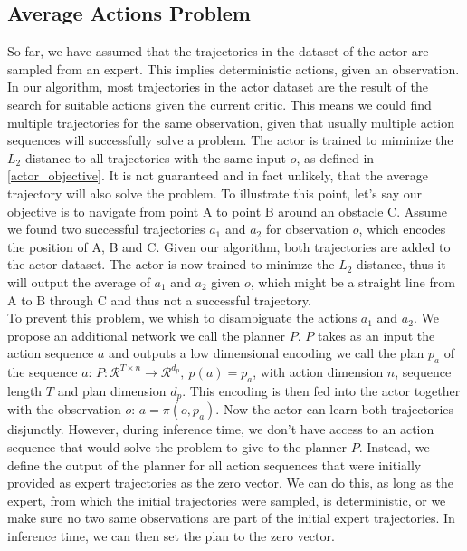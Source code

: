 \subsection{Average Actions Problem}
\label{avr_action_problem}
So far, we have assumed that the trajectories in the dataset of the actor are sampled from an expert. This implies deterministic actions, given an observation. 
In our algorithm, most trajectories in the actor dataset are the result of the search for suitable actions given the current critic. This means we could find
multiple trajectories for the same observation, given that usually multiple action sequences will successfully solve a problem. The actor is trained to miminize 
the $L_2$ distance to all trajectories with the same input $o$, as defined in \ref{actor_objective}. It is not guaranteed and in fact unlikely, that the 
average trajectory will also solve the problem. To illustrate this point, let's say our objective 
is to navigate from point A to point B around an obstacle C. Assume we found two successful trajectories 
$a_1$ and $a_2$ for observation $o$, which encodes the position of A, B and C. Given our algorithm, both trajectories are added to the actor dataset. 
The actor is now trained to minimze the $L_2$ distance, thus it will output the average of $a_1$ and $a_2$ given $o$, which might be a straight line from A to B 
through C and thus not a successful trajectory. \\
To prevent this problem, we whish to disambiguate the actions $a_1$ and $a_2$. We propose an additional network we call the planner $P$. $P$ takes as an input 
the action sequence $a$ and outputs a low dimensional encoding we call the plan $p_a$ of the sequence $a$: 
$P:\mathcal{R}^{T\times n} \rightarrow \mathcal{R}^{d_p},\ p(a) = p_a$, with action dimension $n$, sequence length $T$ and plan dimension $d_p$. This encoding is then fed into the actor together 
with the observation $o$: $a = \pi(o, p_a)$. Now the actor can learn both trajectories disjunctly. However, during inference time, we don't have access to an action sequence 
that would solve the problem to give to the planner $P$. Instead, we define the output of the planner for all action sequences that were initially provided as 
expert trajectories as the zero vector. We can do this, as long as the expert, from which the initial trajectories were sampled, is deterministic, or we make sure 
no two same observations are part of the initial expert trajectories. In inference time, we can then set the plan to the zero vector. 

